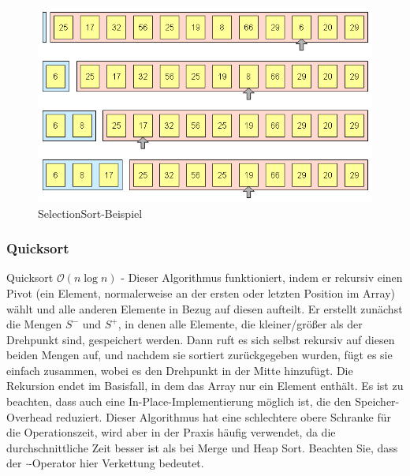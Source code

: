 \documentclass[a4paper]{article}
\begin{document}
    \begin{figure}[h]
        \centering
        \includegraphics[scale=0.3]{Pictures/selectionsort_idee_version1.png}
        \caption{SelectionSort-Beispiel}
        \label{fig:SelectionSort}
    \end{figure}

   
\newpage    

    \subsubsection{Quicksort}\label{Quicksort}
    Quicksort $\mathcal{O}(n\log n)$ - Dieser Algorithmus funktioniert, indem er rekursiv einen Pivot (ein Element, normalerweise an der ersten oder letzten Position im Array) wählt und alle anderen Elemente in Bezug auf diesen aufteilt. Er erstellt zunächst die Mengen $S^-$ und $S^+$, in denen alle Elemente, die kleiner/größer als der Drehpunkt sind, gespeichert werden. Dann ruft es sich selbst rekursiv auf diesen beiden Mengen auf, und nachdem sie sortiert zurückgegeben wurden, fügt es sie einfach zusammen, wobei es den Drehpunkt in der Mitte hinzufügt. Die Rekursion endet im Basisfall, in dem das Array nur ein Element enthält. Es ist zu beachten, dass auch eine In-Place-Implementierung möglich ist, die den Speicher-Overhead reduziert. Dieser Algorithmus hat eine schlechtere obere Schranke für die Operationszeit, wird aber in der Praxis häufig verwendet, da die durchschnittliche Zeit besser ist als bei Merge und Heap Sort. Beachten Sie, dass der $\cdot$-Operator hier Verkettung bedeutet.
\end{document}
